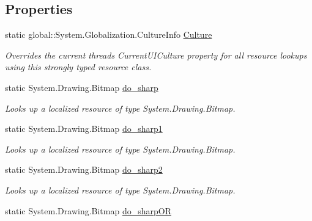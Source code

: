 \subsection*{Properties}
\begin{DoxyCompactItemize}
\item 
static global\+::\+System.\+Globalization.\+Culture\+Info \hyperlink{classWildlifeTrackingApp_1_1Properties_1_1Resources_a97174a2d0af83f0bd014787ac18be56c}{Culture}
\begin{DoxyCompactList}\small\item\em Overrides the current thread\textquotesingle{}s Current\+U\+I\+Culture property for all resource lookups using this strongly typed resource class. \end{DoxyCompactList}\item 
static System.\+Drawing.\+Bitmap \hyperlink{classWildlifeTrackingApp_1_1Properties_1_1Resources_a15aed0ef2486e45a469e5dbf88bce9c4}{do\+\_\+sharp}
\begin{DoxyCompactList}\small\item\em Looks up a localized resource of type System.\+Drawing.\+Bitmap. \end{DoxyCompactList}\item 
static System.\+Drawing.\+Bitmap \hyperlink{classWildlifeTrackingApp_1_1Properties_1_1Resources_ad3bb29ee465ca7fd713688ed4e7dbf16}{do\+\_\+sharp1}
\begin{DoxyCompactList}\small\item\em Looks up a localized resource of type System.\+Drawing.\+Bitmap. \end{DoxyCompactList}\item 
static System.\+Drawing.\+Bitmap \hyperlink{classWildlifeTrackingApp_1_1Properties_1_1Resources_af2008514522aed5e1ed9d40c4dec4c6b}{do\+\_\+sharp2}
\begin{DoxyCompactList}\small\item\em Looks up a localized resource of type System.\+Drawing.\+Bitmap. \end{DoxyCompactList}\item 
static System.\+Drawing.\+Bitmap \hyperlink{classWildlifeTrackingApp_1_1Properties_1_1Resources_af4364b8861b665b628d538a18d818fbd}{do\+\_\+sharp\+OR}

\end{DoxyCompactItemize}
